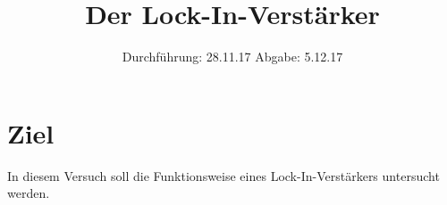 

\subject{V303}
\title{Der Lock-In-Verstärker}
\date{%
  Durchführung: 28.11.17
  \hspace{3em}
  Abgabe: 5.12.17
}



\maketitle
\thispagestyle{empty}
\tableofcontents
\newpage
\section{Ziel}
\label{sec:Ziel}
In diesem Versuch soll die Funktionsweise eines Lock-In-Verstärkers untersucht werden.






\printbibliography{}


